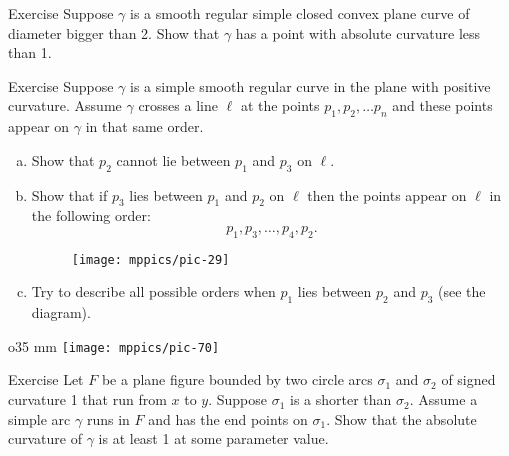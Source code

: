 \begin{thm}{Exercise}\label{ex:convex small}
Suppose $\gamma$ is a smooth regular simple closed convex plane curve of diameter bigger than 2.
Show that $\gamma$ has a point with absolute curvature less than 1.
\end{thm}

\begin{thm}{Exercise}\label{ex:line-curve-intersections}
Suppose $\gamma$ is a simple smooth regular curve in the plane with positive curvature.
Assume $\gamma$ crosses a line $\ell$ at the points $p_1,p_2,\dots p_n$ and these points appear on $\gamma$ in that same order.
\begin{enumerate}[(a)]

\item\label{ex:line-curve-intersections:a} Show that $p_2$ cannot lie between $p_1$ and $p_3$ on $\ell$.

\item\label{ex:line-curve-intersections:b} Show that if $p_3$ lies between $p_1$ and $p_2$ on $\ell$ then the points appear on $\ell$ in the following order:  
\[p_1,p_3,\dots,p_4 ,p_2.\]

\begin{figure}[h!]
\vskip-0mm
\centering
\texttt{[image: mppics/pic-29]}
\vskip0mm
\end{figure}

\item Try to describe all possible orders when $p_1$ lies between $p_2$ and $p_3$ (see the diagram).

\end{enumerate}
\end{thm}



{

\begin{wrapfigure}{o}{35 mm}
\vskip-4mm
\centering
\texttt{[image: mppics/pic-70]}
\vskip0mm
\end{wrapfigure}

\begin{thm}{Exercise}
Let $F$ be a plane figure bounded by two circle arcs $\sigma_1$ and $\sigma_2$ of signed curvature 1 that run from $x$ to $y$.
Suppose $\sigma_1$ is a shorter than $\sigma_2$.
Assume a simple arc $\gamma$ runs in $F$ and has the end points on $\sigma_1$.
Show that the absolute curvature of $\gamma$ is at least 1 at some parameter value.

\end{thm}

}

